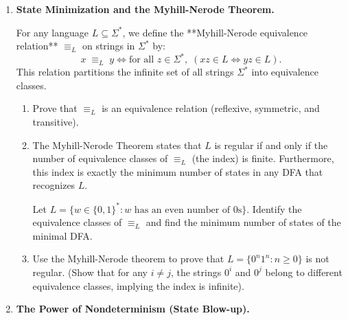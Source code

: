 \documentclass[12pt, a4paper]{book}
\begin{document}
\begin{deepbox}
\begin{enumerate}[label=\textbf{D\arabic*.}]
  \item \textbf{State Minimization and the Myhill-Nerode Theorem.}
  
        For any language $L \subseteq \Sigma^*$, we define the **Myhill-Nerode equivalence relation** $\equiv_L$ on strings in $\Sigma^*$ by:
        \[
          x \;\equiv_L\; y \iff \text{for all } z \in \Sigma^*, \; (xz \in L \iff yz \in L).
        \]
        This relation partitions the infinite set of all strings $\Sigma^*$ into equivalence classes.
        
        \begin{enumerate}[label=(\alph*)]
          \item Prove that $\equiv_L$ is an equivalence relation (reflexive, symmetric, and transitive).
          \item The Myhill-Nerode Theorem states that $L$ is regular if and only if the number of equivalence classes of $\equiv_L$ (the index) is finite.
                Furthermore, this index is exactly the minimum number of states in any DFA that recognizes $L$.
                
                Let $L = \{w \in \{0,1\}^* : w \text{ has an even number of 0s}\}$.
                Identify the equivalence classes of $\equiv_L$ and find the minimum number of states of the minimal DFA.
          \item Use the Myhill-Nerode theorem to prove that $L = \{0^n 1^n : n \ge 0\}$ is not regular. (Show that for any $i \neq j$, the strings $0^i$ and $0^j$ belong to different equivalence classes, implying the index is infinite).
        \end{enumerate}

  \item \textbf{The Power of Nondeterminism (State Blow-up).}
  

\end{enumerate}
\end{deepbox}
\end{document}

